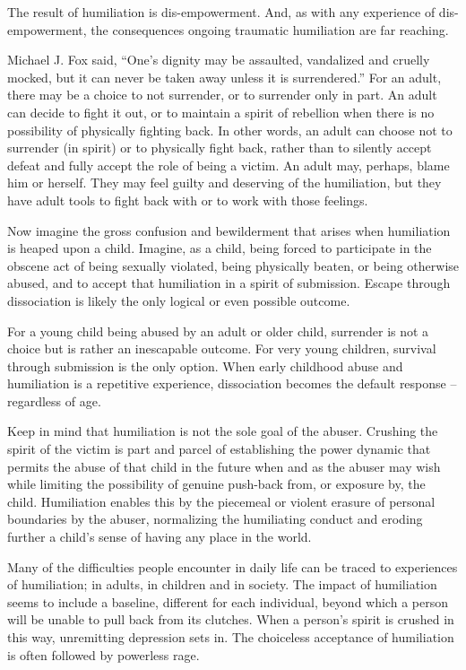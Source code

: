 \documentclass[]{book}
\begin{document}
The result of humiliation is dis-empowerment. And, as with any experience of dis-empowerment, the consequences ongoing traumatic humiliation are far reaching.

Michael J. Fox said, ``One's dignity may be assaulted, vandalized and cruelly mocked, but it can never be taken away unless it is surrendered.'' For an adult, there may be a choice to not surrender, or to surrender only in part. An adult can decide to fight it out, or to maintain a spirit of rebellion when there is no possibility of physically fighting back. In other words, an adult can choose not to surrender (in spirit) or to physically fight back, rather than to silently accept defeat and fully accept the role of being a victim. An adult may, perhaps, blame him or herself. They may feel guilty and deserving of the humiliation, but they have adult tools to fight back with or to work with those feelings.

Now imagine the gross confusion and bewilderment that arises when humiliation is heaped upon a child. Imagine, as a child, being forced to participate in the obscene act of being sexually violated, being physically beaten, or being otherwise abused, and to accept that humiliation in a spirit of submission. Escape through dissociation is likely the only logical or even possible outcome.

For a young child being abused by an adult or older child, surrender is not a choice but is rather an inescapable outcome. For very young children, survival through submission is the only option. When early childhood abuse and humiliation is a repetitive experience, dissociation becomes the default response -- regardless of age.

Keep in mind that humiliation is not the sole goal of the abuser. Crushing the spirit of the victim is part and parcel of establishing the power dynamic that permits the abuse of that child in the future when and as the abuser may wish while limiting the possibility of genuine push-back from, or exposure by, the child. Humiliation enables this by the piecemeal or violent erasure of personal boundaries by the abuser, normalizing the humiliating conduct and eroding further a child's sense of having any place in the world.

Many of the difficulties people encounter in daily life can be traced to experiences of humiliation; in adults, in children and in society. The impact of humiliation seems to include a baseline, different for each individual, beyond which a person will be unable to pull back from its clutches. When a person's spirit is crushed in this way, unremitting depression sets in. The choiceless acceptance of humiliation is often followed by powerless rage.
\end{document}
